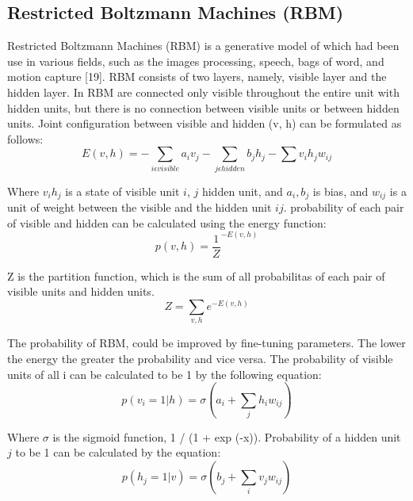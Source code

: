 \documentclass[conference]{IEEEtran}
\begin{document}
\subsection{Restricted Boltzmann Machines (RBM)}
Restricted Boltzmann Machines (RBM) is a generative model of which had been
use in various fields, such as the images processing, speech, bags of word, and motion capture [19]. RBM consists of two layers, namely, visible layer and the hidden layer. In RBM are connected only
visible throughout the entire unit with hidden units, but there is no connection
between visible units or between hidden units.
Joint configuration between visible and hidden (v, h) can be formulated as follows:
\begin{equation} 
E(v,h)=-\sum_{i \epsilon visible }a_{i}v_{j} -\sum_{j \epsilon hidden} b_{j}h_{j} - \sum{v_{i}h_{j}w_{ij}}
\end{equation}

Where $v_{i} h_{j}$ is a state of visible unit $i$, $j$ hidden unit, and $a_{i}, b_{j}$ is
bias, and $w_{ij}$ is a unit of weight between the visible and the hidden unit $i j$. probability
of each pair of visible and hidden can be calculated using the energy function:
\begin{equation}
p(v,h)=\frac{1}{Z}^{-E(v,h)}
\end{equation}

Z is the partition function, which is the sum of all probabilitas of each pair of visible units and hidden units.
\begin{equation}
Z= \sum_{v,h}e^{-E(v,h)}
\end{equation}

The probability of RBM, could be improved by fine-tuning parameters. The lower the energy the greater the probability and vice versa. The probability of visible units of all i can be calculated to be 1 by the following equation:
\begin{equation}
p(v_{i}=1|h)=\sigma (a_{i}+\sum_{j}h_{i}w_{ij})
\end{equation}

Where $\sigma $ is the sigmoid function, 1 / (1 + exp (-x)).  Probability of a hidden unit $j$ to be 1 can be calculated by the equation:
\begin{equation}
p(h_{j}=1|v)=\sigma (b_{j}+\sum_{i}v_{j}w_{ij})
\end{equation}
\end{document}
